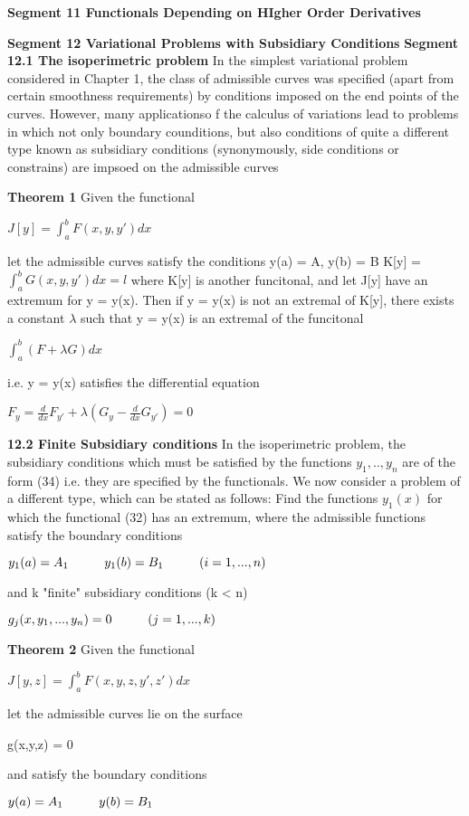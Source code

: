 \documentclass{article}
\newcommand\tab[1][1cm]{\hspace*{#1}}
\begin{document}
\textbf {Segment 11 Functionals Depending on HIgher Order Derivatives}

\textbf {Segment 12 Variational Problems with Subsidiary Conditions}
\textbf {Segment 12.1 The isoperimetric problem} In the simplest variational problem considered in Chapter 1, the class of admissible curves was specified (apart from certain smoothness requirements) by conditions imposed on the end points of the curves. However, many applicationso f the calculus of variations lead to problems in which not only boundary counditions, but also conditions of quite a different type known as subsidiary conditions (synonymously, side conditions or constrains) are impsoed on the admissible curves

\textbf {Theorem 1} Given the functional
\begin{center}
$J[y] = \int_a^b F(x,y, y') dx$
\end{center}
let the admissible curves satisfy the conditions
\tab y(a) = A, \tab y(b) = B \tab K[y] = $\int_a^b G(x,y, y') dx = l$
where K[y] is another funcitonal, and let J[y] have an extremum for y = y(x). Then if y = y(x) is not an extremal of K[y], there exists a constant $\lambda$ such that y = y(x) is an extremal of the funcitonal
\begin{center}
$\int_a^b (F + \lambda G) dx$
\end{center}
i.e. y = y(x) satisfies the differential equation
\begin{center}
$F_y = \frac{d}{dx} F_{y'} + \lambda (G_y - \frac{d}{dx} G_{y'}) = 0$
\end{center}

\textbf {12.2 Finite Subsidiary conditions} In the isoperimetric problem, the subsidiary conditions which must be satisfied by the functions $y_1 ,.., y_n$ are of the form (34) i.e. they are specified by the functionals. We now consider a problem of a different type, which can be stated as follows: Find the functions $y_1(x)$ for which the functional (32) has an extremum, where the admissible functions satisfy the boundary conditions
\begin{center}
$y_1(a) = A_1 \tab y_1(b) = B_1 \tab (i = 1 ,..., n)$
\end{center}
and k "finite" subsidiary conditions (k < n)
\begin{center}
$g_j(x, y_1,...,y_n) = 0 \tab (j = 1,..., k)$
\end{center}

\textbf {Theorem 2 } Given the functional
\begin{center}
$J[y,z] = \int_a^b F(x, y, z, y', z') dx$
\end{center}
let the admissible curves lie on the surface
\begin{center}
g(x,y,z) = 0
\end{center}
and satisfy the boundary conditions
\begin{center}
$y(a) = A_1 \tab y(b) = B_1$
\end{center}
\end{document}
